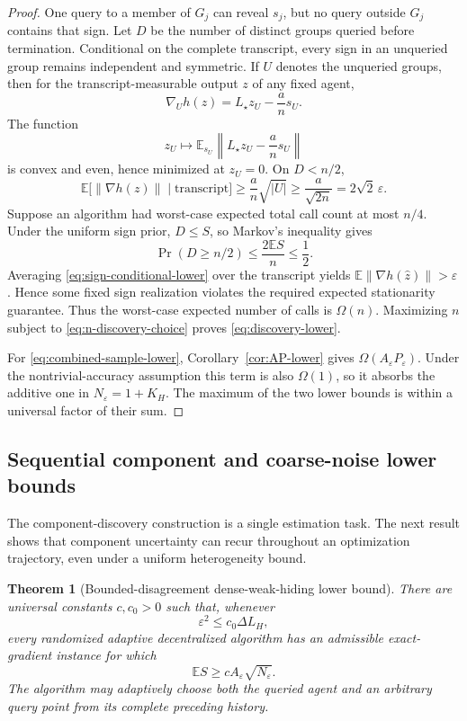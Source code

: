 \documentclass[11pt,a4paper]{article}
\newcommand{\E}{\mathbb{E}}
\newcommand{\eps}{\varepsilon}
\newcommand{\norm}[1]{\left\lVert #1\right\rVert}
\newtheorem{theorem}{Theorem}[section]
\theoremstyle{remark}
\begin{document}
\begin{proof}
One query to a member of $G_j$ can reveal $s_j$, but no query outside $G_j$
contains that sign.  Let $D$ be the number of distinct groups queried before
termination.  Conditional on the complete transcript, every sign in an
unqueried group remains independent and symmetric.  If $U$ denotes the
unqueried groups, then for the transcript-measurable output $z$ of any fixed
agent,
\[
 \nabla_U h(z)=L_\star z_U-\frac an s_U.
\]
The function
\[
 z_U\longmapsto
 \E_{s_U}\norm{L_\star z_U-\frac an s_U}
\]
is convex and even, hence minimized at $z_U=0$.  On $D<n/2$,
\begin{equation}
 \E\bigl[\norm{\nabla h(z)}\mid\text{transcript}\bigr]
 \ge\frac an\sqrt{|U|}
 \ge\frac{a}{\sqrt{2n}}
 =2\sqrt2\,\eps.
 \label{eq:sign-conditional-lower}
\end{equation}
Suppose an algorithm had worst-case expected total call count at most $n/4$.
Under the uniform sign prior, $D\le S$, so Markov's inequality gives
\[
 \Pr(D\ge n/2)\le\frac{2\E S}{n}\le\frac12.
\]
Averaging \eqref{eq:sign-conditional-lower} over the transcript yields
$\E\norm{\nabla h(\widehat z)}>\eps$.  Hence some fixed sign realization
violates the required expected stationarity guarantee.  Thus the worst-case
expected number of calls is $\Omega(n)$.  Maximizing $n$ subject to
\eqref{eq:n-discovery-choice} proves \eqref{eq:discovery-lower}.

For \eqref{eq:combined-sample-lower},
Corollary~\ref{cor:AP-lower} gives $\Omega(A_\eps P_\eps)$.  Under the
nontrivial-accuracy assumption this term is also $\Omega(1)$, so it absorbs
the additive one in $N_\eps=1+K_H$.  The maximum of the two lower bounds is
within a universal factor of their sum.
\end{proof}
\subsection{Sequential component and coarse-noise lower bounds}

The component-discovery construction is a single estimation task. The next
result shows that component uncertainty can recur throughout an optimization
trajectory, even under a uniform heterogeneity bound.

\begin{theorem}[Bounded-disagreement dense-weak-hiding lower bound]
\label{thm:retiring-dwh-lower}
There are universal constants $c,c_0>0$ such that, whenever
\begin{equation}
 \eps^2\le c_0\Delta L_H,
 \label{eq:retiring-nontrivial}
\end{equation}
every randomized adaptive decentralized algorithm has an admissible
exact-gradient instance for which
\begin{equation}
 \boxed{
 \E S\ge c A_\eps\sqrt{N_\eps}.}
 \label{eq:retiring-square-root-lower}
\end{equation}
The algorithm may adaptively choose both the queried agent and an arbitrary
query point from its complete preceding history.
\end{theorem}
\end{document}
